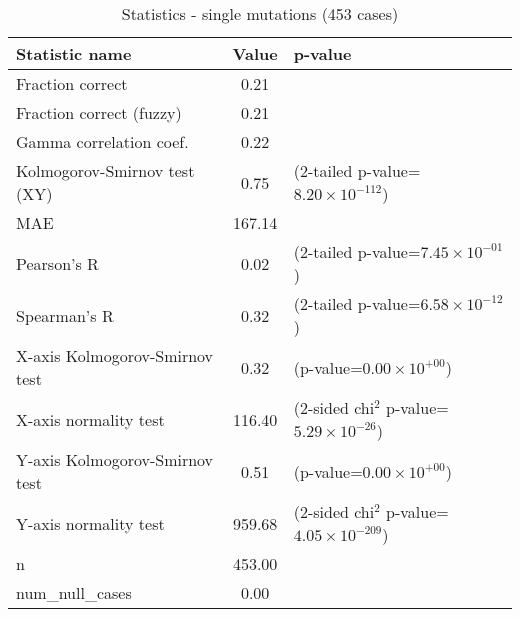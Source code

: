 \documentclass[10pt, letterpaper, oneside, titlepage, landscape]{scrreprt}
\begin{document}
\begin{table}[H]\begin{center}
\begin{tabular}{ l S[table-format=3.2] l}
Statistic name & {Value} & p-value\\
\hline
Fraction correct & 0.21 & \\
Fraction correct (fuzzy) & 0.21 & \\
Gamma correlation coef. & 0.22 & \\
Kolmogorov-Smirnov test (XY) & 0.75 & (2-tailed p-value=$8.20\times10^{-112}$)\\
MAE & 167.14 & \\
Pearson's R & 0.02 & (2-tailed p-value=$7.45\times10^{-01}$)\\
Spearman's R & 0.32 & (2-tailed p-value=$6.58\times10^{-12}$)\\
X-axis Kolmogorov-Smirnov test & 0.32 & (p-value=$0.00\times10^{+00}$)\\
X-axis normality test & 116.40 & (2-sided chi$^{2}$ p-value=$5.29\times10^{-26}$)\\
Y-axis Kolmogorov-Smirnov test & 0.51 & (p-value=$0.00\times10^{+00}$)\\
Y-axis normality test & 959.68 & (2-sided chi$^{2}$ p-value=$4.05\times10^{-209}$)\\
n & 453.00 & \\
num\_null\_cases & 0.00 & \\
\end{tabular}
\caption{Statistics - single mutations (453 cases)}
\end{center}\end{table}
\end{document}
